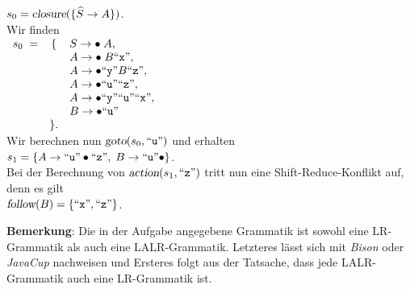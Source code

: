 \documentclass{article}
\newcommand{\quoted}[1]{\mbox{``\texttt{#1}''}}
\begin{document}
\begin{enumerate}
      $s_0 = \textsl{closure}( \{ \widehat{S} \rightarrow A \})$.
      \\[0.2cm]
      Wir finden
      \\[0.2cm]
      \hspace*{1.3cm}
      $
      \begin{array}[t]{lcl}  
       s_0 \;= & \{ & S \rightarrow \bullet\; A,                              \\
               &    & A \rightarrow \bullet\; B \quoted{x},                   \\
               &    & A \rightarrow \bullet \quoted{y} B \quoted{z},          \\
               &    & A \rightarrow \bullet \quoted{u} \quoted{z},            \\
               &    & A \rightarrow \bullet \quoted{y} \quoted{u} \quoted{x}, \\
               &    & B \rightarrow \bullet \quoted{u}                        \\
               & \}. 
      \end{array}
      $
      \\[0.2cm]
      Wir berechnen nun $\textsl{goto}(s_0, \quoted{u})$ und erhalten
      \\[0.2cm]
      \hspace*{1.3cm}
      $s_1 = \{ A \rightarrow \quoted{u} \bullet \quoted{z},\;
                B \rightarrow \quoted{u} \bullet
             \}
      $.
      \\[0.2cm]
      Bei der Berechnung von $\textsl{action}(s_1, \quoted{z})$ tritt nun eine Shift-Reduce-Konflikt auf,
      denn es gilt
      \\[0.2cm]
      \hspace*{1.3cm}
      $\textsl{follow}(B) = \{ \quoted{x}, \quoted{z} \}$.

      \noindent
      \textbf{Bemerkung}:  Die in der Aufgabe angegebene Grammatik ist sowohl eine LR-Grammatik als
      auch eine LALR-Grammatik.  Letzteres l\"asst sich mit \textsl{Bison} oder \textsl{JavaCup} nachweisen 
      und Ersteres folgt aus der Tatsache, dass jede LALR-Grammatik auch eine LR-Grammatik ist.
\end{enumerate}
\end{document}
